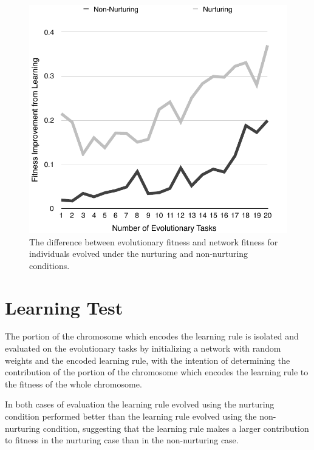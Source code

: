 \documentclass[master]{outhesis}
\begin{document}
\begin{figure}[H]
	\centering
	\includegraphics{LearningImprovementPlot.pdf}
	\caption{The difference between evolutionary fitness and network fitness for individuals evolved under the nurturing and non-nurturing conditions.}
\end{figure}

\section{Learning Test}

The portion of the chromosome which encodes the learning rule is isolated and evaluated on the evolutionary tasks by initializing a network with random weights and the encoded learning rule, with the intention of determining the contribution of the portion of the chromosome which encodes the learning rule to the fitness of the whole chromosome.

In both cases of evaluation the learning rule evolved using the nurturing condition performed better than the learning rule evolved using the non-nurturing condition, suggesting that the learning rule makes a larger contribution to fitness in the nurturing case than in the non-nurturing case.
\end{document}
